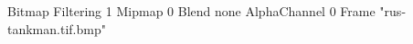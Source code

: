 {Bitmap
	{Filtering 1}
	{Mipmap 0}
	{Blend none}
	{AlphaChannel 0}
	{Frame "rus-tankman.tif.bmp"}
}
